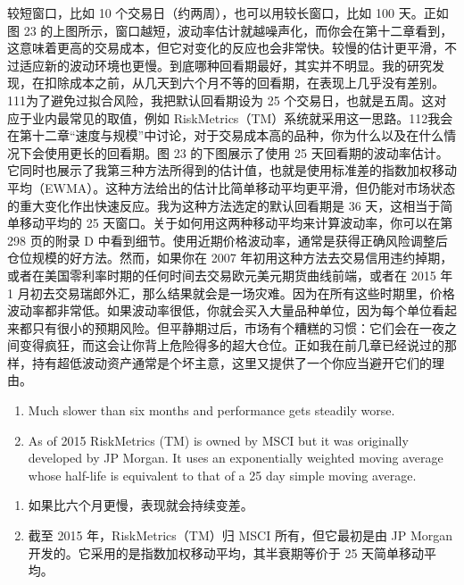 \begin{chineseblock}较短窗口，比如 10 个交易日（约两周），也可以用较长窗口，比如 100 天。正如图 23 的上图所示，窗口越短，波动率估计就越噪声化，而你会在第十二章看到，这意味着更高的交易成本，但它对变化的反应也会非常快。较慢的估计更平滑，不过适应新的波动环境也更慢。到底哪种回看期最好，其实并不明显。我的研究发现，在扣除成本之前，从几天到六个月不等的回看期，在表现上几乎没有差别。111为了避免过拟合风险，我把默认回看期设为 25 个交易日，也就是五周。这对应于业内最常见的取值，例如 RiskMetrics（TM）系统就采用这一思路。112我会在第十二章“速度与规模”中讨论，对于交易成本高的品种，你为什么以及在什么情况下会使用更长的回看期。图 23 的下图展示了使用 25 天回看期的波动率估计。它同时也展示了我第三种方法所得到的估计值，也就是使用标准差的指数加权移动平均（EWMA）。这种方法给出的估计比简单移动平均更平滑，但仍能对市场状态的重大变化作出快速反应。我为这种方法选定的默认回看期是 36 天，这相当于简单移动平均的 25 天窗口。关于如何用这两种移动平均来计算波动率，你可以在第 298 页的附录 D 中看到细节。使用近期价格波动率，通常是获得正确风险调整后仓位规模的好方法。然而，如果你在 2007 年初用这种方法去交易信用违约掉期，或者在美国零利率时期的任何时间去交易欧元美元期货曲线前端，或者在 2015 年 1 月初去交易瑞郎外汇，那么结果就会是一场灾难。因为在所有这些时期里，价格波动率都非常低。如果波动率很低，你就会买入大量品种单位，因为每个单位看起来都只有很小的预期风险。但平静期过后，市场有个糟糕的习惯：它们会在一夜之间变得疯狂，而这会让你背上危险得多的超大仓位。正如我在前几章已经说过的那样，持有超低波动资产通常是个坏主意，这里又提供了一个你应当避开它们的理由。\end{chineseblock}

\begin{enumerate}
\item Much slower than six months and performance gets steadily worse.
\item As of 2015 RiskMetrics (TM) is owned by MSCI but it was originally developed by JP Morgan. It uses an exponentially weighted moving average whose half-life is equivalent to that of a 25 day simple moving average. \end{enumerate}

\begin{enumerate}
\item 如果比六个月更慢，表现就会持续变差。
\item 截至 2015 年，RiskMetrics（TM）归 MSCI 所有，但它最初是由 JP Morgan 开发的。它采用的是指数加权移动平均，其半衰期等价于 25 天简单移动平均。\end{enumerate}

